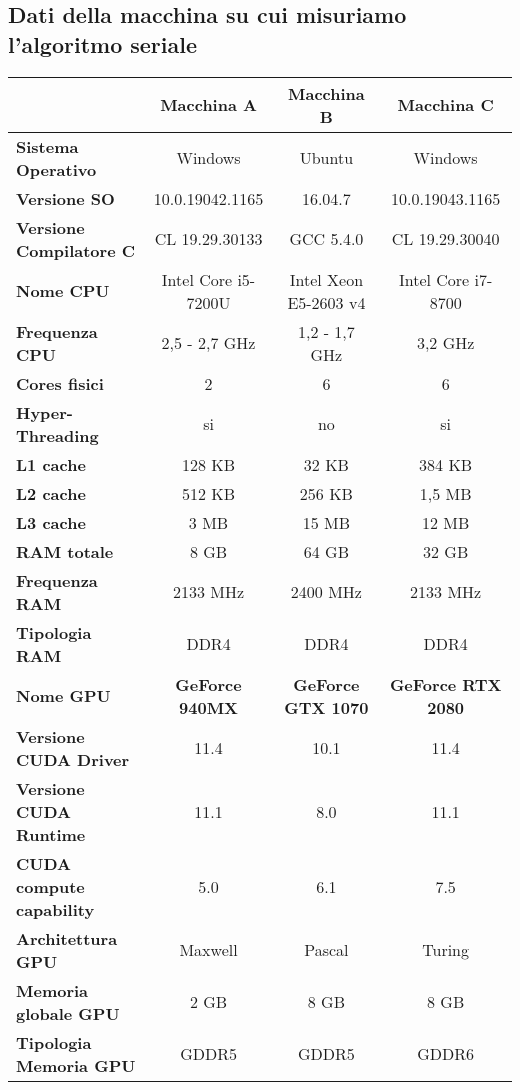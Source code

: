 \documentclass[a4paper]{article}
\begin{document}
	\subsection{Dati della macchina su cui misuriamo l'algoritmo seriale}
	\begin{table}[!ht]
		\centering
		\begin{tabular}{|l|c|c|c|}
			\hline
			& \textbf{Macchina A} & \textbf{Macchina B} & \textbf{Macchina C} \\ \hline
			\textbf{Sistema Operativo} & Windows & Ubuntu & Windows \\ \hline
			\textbf{Versione SO} & 10.0.19042.1165 & 16.04.7 & 10.0.19043.1165 \\ \hline
			\textbf{Versione Compilatore C} & CL 19.29.30133 & GCC 5.4.0 & CL 19.29.30040 \\ \hline
			\textbf{Nome CPU} & Intel Core i5-7200U & Intel Xeon E5-2603 v4 & Intel Core i7-8700 \\ \hline
			\textbf{Frequenza CPU} & 2,5 - 2,7 GHz & 1,2 - 1,7 GHz & 3,2 GHz \\ \hline
			\textbf{Cores fisici} & 2 & 6 & 6 \\ \hline
			\textbf{Hyper-Threading} & si & no & si \\ \hline
			\textbf{L1 cache} & 128 KB & 32 KB & 384 KB \\ \hline
			\textbf{L2 cache} & 512 KB & 256 KB & 1,5 MB \\ \hline
			\textbf{L3 cache} & 3 MB & 15 MB & 12 MB \\ \hline
			\textbf{RAM totale} & 8 GB & 64 GB & 32 GB \\ \hline
			\textbf{Frequenza RAM} & 2133 MHz & 2400 MHz & 2133 MHz \\ \hline
			\textbf{Tipologia RAM} & DDR4 & DDR4 & DDR4 \\ \hline
			\textbf{Nome GPU} & \textbf{GeForce 940MX} & \textbf{GeForce GTX 1070} & \textbf{GeForce RTX 2080} \\ \hline
			\textbf{Versione CUDA Driver} & 11.4 & 10.1 & 11.4 \\ \hline
			\textbf{Versione CUDA Runtime} & 11.1 & 8.0 & 11.1 \\ \hline
			\textbf{CUDA compute capability} & 5.0 & 6.1 & 7.5 \\ \hline
			\textbf{Architettura GPU} & Maxwell & Pascal & Turing \\ \hline
			\textbf{Memoria globale GPU} & 2 GB & 8 GB & 8 GB \\ \hline
			\textbf{Tipologia Memoria GPU} & GDDR5 & GDDR5 & GDDR6 \\ \hline

\end{tabular}
\end{table}
\end{document}
